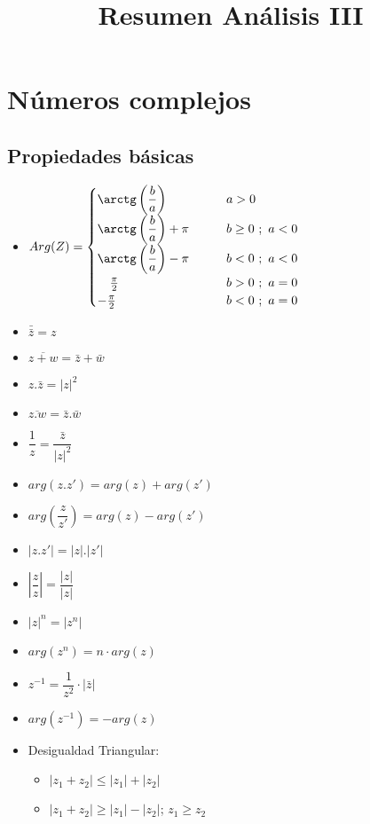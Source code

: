 \documentclass[12pt,a4paper]{article}
\title{Resumen Análisis III}
\author{}
\date{}
\begin{document}
\maketitle

\section{Números complejos}

\subsection*{Propiedades básicas}

\begin{itemize}
    \item $Arg(Z)=\begin{cases} \arctg \left( \dfrac{b}{a} \right) &\qquad a>0  \\ \arctg \left( \dfrac{b}{a} \right) + \pi &\qquad b \geq 0 \ ; \ a<0 \\ \arctg \left( \dfrac{b}{a} \right) - \pi &\qquad b < 0 \ ; \ a<0 \\ \hspace{3.5mm} \frac{\pi}{2} &\qquad b>0 \ ; \ a=0 \\ -\frac{\pi}{2} &\qquad b<0 \ ; \ a=0  \end{cases}$
    \item $\bar{\bar{z}} = z$
    \item $\overline{z+w}= \bar{z}+\bar{w}$
    \item $z.\bar{z}=|z|^2$
    \item $\overline{z.w}=\bar{z}.\bar{w}$
    \item $\dfrac{1}{z}=\dfrac{\bar{z}}{|z|^2}$
    \item $arg(z.z')=arg(z)+arg(z')$
    \item $arg(\dfrac{z}{z'})=arg(z)-arg(z')$
    \item $|z.z'|=|z|.|z'|$
    \item $|\dfrac{z}{z}|=\dfrac{|z|}{|z|}$
    \item $|z|^n=|z^n|$
    \item $arg(z^n)=n\cdot arg(z)$
    \item $z^{-1}=\dfrac{1}{z^2}\cdot|\bar{z}|$
    \item $arg(z^{-1}) = -arg(z)$
    \item Desigualdad Triangular:
    \begin{itemize}
        \item $|z_1 + z_2| \leq |z_1|+|z_2|$
        \item $|z_1 + z_2| \geq |z_1|-|z_2|$; $z_1 \geq z_2$
    \end{itemize}
\end{itemize}   
    
\end{document}
